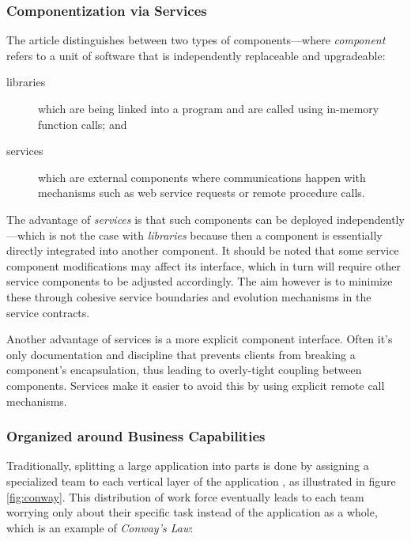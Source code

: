 \subsubsection{Componentization via Services}
\label{sec:componentization}

The article \cite{ms-definition} distinguishes between two types of
components---where \textit{component} refers to a unit of software
that is independently replaceable and upgradeable:

\begin{description}
	\item[libraries] which are being linked into a program and are
		called using in-memory function calls; and
	\item[services] which are external components where communications
		happen with mechanisms such as web service requests or remote
		procedure calls.
\end{description}

The advantage of \textit{services} is that such components can be
deployed independently---which is not the case with \textit{libraries}
because then a component is essentially directly integrated into
another component. It should be noted that some service component
modifications may affect its interface, which in turn will require
other service components to be adjusted accordingly. The aim however
is to minimize these through cohesive service boundaries and evolution
mechanisms in the service contracts.

Another advantage of services is a more explicit component interface.
Often it's only documentation and discipline that prevents clients
from breaking a component's encapsulation, thus leading to
overly-tight coupling between components. Services make it easier to
avoid this by using explicit remote call mechanisms.

\subsubsection{Organized around Business Capabilities}
\label{sec:business-capabilities}

Traditionally, splitting a large application into parts is done by
assigning a specialized team to each vertical layer of the application
\cite{ms-challenges}, as illustrated in figure \ref{fig:conway}. This
distribution of work force eventually leads to each team worrying only
about their specific task instead of the application as a whole, which
is an example of \textit{Conway's Law}:  

